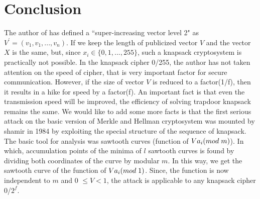 \documentclass[5p,times,twocolumn]{elsarticle}
\begin{document}
\section{Conclusion}
\label{sec:4}
The author of \cite{pham2011improvement} has defined a ``super-increasing vector level 2" as $V^{'}=(v_{1}, v_{1},... ,v_{n})$. If we keep the length of publicized vector $V$ and the vector $X$ is the same, but, since $x_{i} \in \{0,1,... ,255\}$, such a knapsack cryptosystem is practically not possible. In the knapsack cipher 0/255,  the author has not taken attention on the speed of cipher, that is very important factor for secure communication. However, if the size of vector $V$ is reduced to a factor(1/f), then it results in a hike for speed by a factor(f). An important fact is that even the transmission speed will be improved, the efficiency of solving trapdoor knapsack remains the same. We would like to add some more facts is that the first serious attack on the basic version of Merkle and Hellman cryptosystem was mounted by shamir in 1984 \cite{shamir1984polynomial} by exploiting the special structure of the sequence of knapsack. The basic tool for analysis was sawtooth curves (function of $Va_i(mod \hspace{1 mm} m)$). In which, accumulation points of the minima of $l$ sawtooth curves is found by dividing both coordinates of the curve by modular $m$. In this way, we get the sawtooth curve of the function of $Va_{i}(mod \hspace{1 mm}1)$. Since, the function is now independent to $m$ and 0 $ \leq 
V<1$, the attack is applicable to any knapsack cipher 0/$2^f$.




\end{document}
